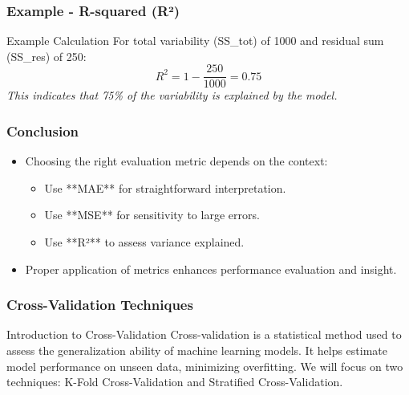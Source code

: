 \documentclass[aspectratio=169]{beamer}
\begin{document}
\begin{frame}[fragile]
    \frametitle{Example - R-squared (R²)}
    \begin{block}{Example Calculation}
        For total variability (SS\_tot) of 1000 and residual sum (SS\_res) of 250:
        \begin{equation}
            R^2 = 1 - \frac{250}{1000} = 0.75
        \end{equation}
        \textit{This indicates that 75\% of the variability is explained by the model.}
    \end{block}
\end{frame}

\begin{frame}[fragile]
    \frametitle{Conclusion}
    \begin{itemize}
        \item Choosing the right evaluation metric depends on the context:
        \begin{itemize}
            \item Use **MAE** for straightforward interpretation.
            \item Use **MSE** for sensitivity to large errors.
            \item Use **R²** to assess variance explained.
        \end{itemize}
        \item Proper application of metrics enhances performance evaluation and insight.
    \end{itemize}
\end{frame}

\begin{frame}
    \frametitle{Cross-Validation Techniques}
    \begin{block}{Introduction to Cross-Validation}
        Cross-validation is a statistical method used to assess the generalization ability of machine learning models. It helps estimate model performance on unseen data, minimizing overfitting. We will focus on two techniques: K-Fold Cross-Validation and Stratified Cross-Validation.
    \end{block}
\end{frame}
\end{document}
